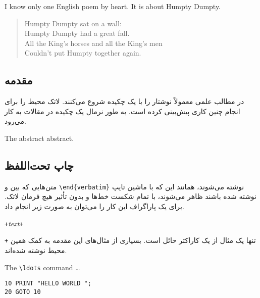 \begin{example}
I know only one English poem by 
heart. It is about Humpty Dumpty.
\begin{flushleft}
\begin{verse}
Humpty Dumpty sat on a wall:\\
Humpty Dumpty had a great fall.\\ 
All the King's horses and all
the King's men\\
Couldn't put Humpty together
again.
\end{verse}
\end{flushleft}
\end{example}
\subsection{مقدمه}
در مطالب علمی معمولاً نوشتار را با یک چکیده شروع می‌کنند. لاتک محیط
را برای انجام چنین کاری پیش‌بینی کرده است. به طور نرمال یک چکیده در مقالات به کار می‌رود.

\newenvironment{abstract}%
        {\begin{center}\begin{small}\begin{minipage}{0.8\textwidth}}%
        {\end{minipage}\end{small}\end{center}}
\begin{example}
\begin{abstract}
The abstract abstract.
\end{abstract}
\end{example}

\subsection{چاپ تحت‌اللفظ}
متن‌هایی که بین 
و
\verb|\end{verbatim}| 
نوشته می‌شوند، همانند این که با ماشین تایپ نوشته شده باشند ظاهر می‌شوند، با تمام شکست خط‌ها و بدون تأثیر هیچ فرمان لاتک. برای یک پاراگراف این کار را می‌توان به صورت زیر انجام داد.
\begin{lscommand}
\verb|+|\emph{text}\verb|+|
\end{lscommand}
\noindent \verb|+| 
تنها یک مثال از یک کاراکتر حائل است. بسیاری از مثال‌های این مقدمه به کمک همین محیط نوشته شده‌اند.

\begin{example}
The \verb|\ldots| command \ldots

\begin{verbatim}
10 PRINT "HELLO WORLD ";
20 GOTO 10
\end{verbatim}
\end{example}


